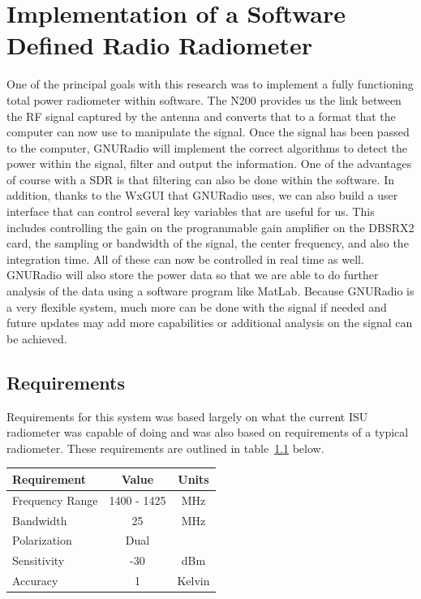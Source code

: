 \chapter{Implementation of a Software Defined Radio Radiometer}
One of the principal goals with this research was to implement a fully functioning total power radiometer within software.  The N200 provides us the link between the RF signal captured by the antenna and converts that to a format that the computer can now use to manipulate the signal.  Once the signal has been passed to the computer, GNURadio will implement the correct algorithms to detect the power within the signal, filter and output the information.  One of the advantages of course with a SDR is that filtering can also be done within the software.  In addition, thanks to the WxGUI that GNURadio uses, we can also build a user interface that can control several key variables that are useful for us.  This includes controlling the gain on the programmable gain amplifier on the DBSRX2 card, the sampling or bandwidth of the signal, the center frequency, and also the integration time.  All of these can now be controlled in real time as well.  GNURadio will also store the power data so that we are able to do further analysis of the data using a software program like MatLab.  Because GNURadio is a very flexible system, much more can be done with the signal if needed and future updates may add more capabilities or additional analysis on the signal can be achieved.

\section{Requirements}

Requirements for this system was based largely on what the current ISU radiometer was capable of doing and was also based on requirements of a typical radiometer.  These requirements are outlined in table~\ref{requirements} below.


\begin{table}[h!tb] \centering
{}
\label{requirements}
\begin{tabular}{lcc} \hline
\textbf{Requirement} & \textbf{Value} & \textbf{Units} \\ \hline
Frequency Range & 1400 - 1425 & MHz \\
Bandwidth & 25 & MHz \\
Polarization & Dual &  \\ 
Sensitivity & -30 & dBm \\
Accuracy & 1 & Kelvin \\ \hline
\end{tabular}
\end{table}

